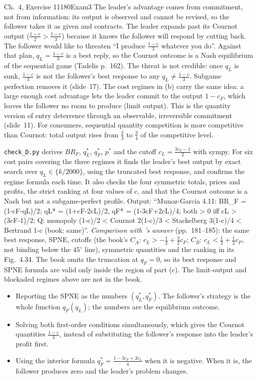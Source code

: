 \begin{exsol}{\MG{} Ch.~4, Exercise 11}{180}{Exam}{3}
\interp The leader's advantage comes from commitment, not from information: its output is
observed and cannot be revised, so the follower takes it as given and contracts. The leader
expands past its Cournot output ($\frac{1-c}{2} > \frac{1-c}{3}$) because it knows the follower will
respond by cutting back. The follower would like to threaten ``I produce $\frac{1-c}{3}$ whatever you
do''. Against that plan, $q_L = \frac{1-c}{3}$ is a best reply, so the Cournot outcome is a Nash
equilibrium of the sequential game (Tadelis p.~162). The threat is not credible: once $q_L$ is
sunk, $\frac{1-c}{3}$ is not the follower's best response to any $q_L \ne \frac{1-c}{3}$. Subgame
perfection removes it (slide~17). The cost regimes in (b) carry the same idea: a large enough cost
advantage lets the leader commit to the output $1-c_F$, which leaves the follower no room to
produce (limit output). This is the quantity version of entry deterrence through
an observable, irreversible commitment (slide~11). For consumers, sequential quantity competition
is more competitive than Cournot: total output rises from $\frac23$ to $\frac34$ of the competitive
level.

\verify \texttt{check\_D.py} derives $BR_F$, $q_L^*$, $q_F^*$, $p^*$ and the cutoff
$c_L = \frac{3c_F-1}{2}$ with sympy. For six cost pairs covering the three regimes it finds the
leader's best output by exact search over $q_L \in \{k/2000\}$, using the truncated best response,
and confirms the regime formula each time. It also checks the four symmetric totals, prices and
profits, the strict ranking at four values of $c$, and that the Cournot outcome is a Nash but not a
subgame-perfect profile. Output: ``Munoz-Garcia 4.11: BR\_F = (1-cF-qL)/2; qL* = (1+cF-2cL)/2,
qF* = (1-3cF+2cL)/4; both > 0 iff cL > (3cF-1)/2; Q: monopoly (1-c)/2 < Cournot 2(1-c)/3 <
Stackelberg 3(1-c)/4 < Bertrand 1-c (book: same)''.
\emph{Comparison with \MG{}'s answer} (pp.~181--185): the same best response, SPNE, cutoffs (the
book's $C_A$: $c_L > -\frac12 + \frac32c_F$; $C_B$: $c_L < \frac12 + \frac12c_F$, not binding below
the $45^\circ$ line), symmetric quantities and the ranking in its Fig.~4.34. The book omits the
truncation at $q_F = 0$, so its best response and SPNE formula are valid only inside the region
of part (c). The limit-output and blockaded regimes above are not in the book.

\mistakes
\begin{itemize}
  \item Reporting the SPNE as the numbers $(q_L^*, q_F^*)$. The follower's strategy is the whole
  function $q_F(q_L)$; the numbers are the equilibrium outcome.
  \item Solving both first-order conditions simultaneously, which gives the Cournot quantities
  $\frac{1-c}{3}$, instead of substituting the follower's response into the leader's profit first.
  \item Using the interior formula $q_F^* = \frac{1-3c_F+2c_L}{4}$ when it is negative. When it is,
  the follower produces zero and the leader's problem changes.
\end{itemize}


\end{exsol}

